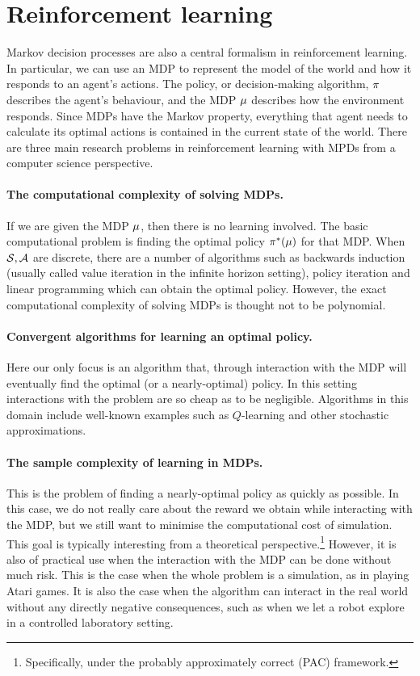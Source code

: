 \section{Reinforcement learning}
\label{sec:reinf-learn}

Markov decision processes are also a central formalism in reinforcement learning. In particular, we can use an MDP to represent the model of the world and how it responds to an agent's actions. The policy, or decision-making algorithm, $\pi$ describes the agent's behaviour, and the MDP $\mu$ describes how the environment responds. Since MDPs have the Markov property, everything that agent needs to calculate its optimal actions is contained in the current state of the world. There are three main research problems in reinforcement learning with MPDs from a computer science perspective.

\paragraph{The computational complexity of solving MDPs.}
If we are given the MDP $\mu$, then there is no learning involved. The basic computational problem is finding the optimal policy $\pi^*(\mu)$ for that MDP. When ${\mathcal{S}}, {\mathcal{A}}$ are discrete, there are a number of algorithms such as backwards induction (usually called value iteration in the infinite horizon setting), policy iteration and linear programming which can obtain the optimal policy. However, the exact computational complexity of solving MDPs is thought not to be polynomial.

\paragraph{Convergent algorithms for learning an optimal policy.}
Here our only focus is an algorithm that, through interaction with the MDP will eventually find the optimal (or a nearly-optimal) policy. In this setting interactions with the problem are so cheap as to be negligible. Algorithms in this domain include well-known examples such as $Q$-learning and other stochastic approximations.

\paragraph{The sample complexity of learning in MDPs.}
This is the problem of finding a nearly-optimal policy as quickly as possible. In this case, we do not really care about the reward we obtain while interacting with the MDP, but we still want to minimise the computational cost of simulation. This goal is typically interesting from a theoretical perspective.\footnote{Specifically, under the probably approximately correct (PAC) framework.} However, it is also of practical use when the interaction with the MDP can be done without much risk. This is the case when the whole problem is a simulation, as in playing Atari games. It is also the case when the algorithm can interact in the real world without any directly negative consequences, such as when we let a robot explore in a controlled laboratory setting.

